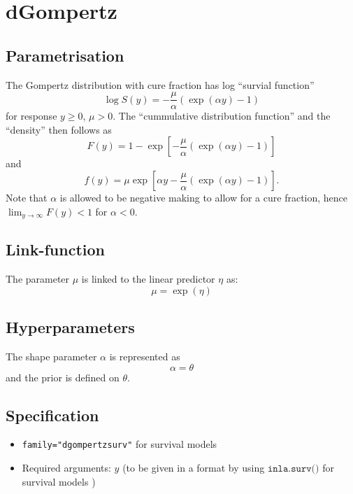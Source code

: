 \documentclass[a4paper,11pt]{article}
\begin{document}
\section*{dGompertz}

\subsection*{Parametrisation}

The Gompertz distribution with cure fraction has log ``survial function''
\begin{displaymath}
    \log S(y) = -\frac{\mu}{\alpha}\left(\exp(\alpha y) -1\right)
\end{displaymath}
for response $y\ge 0$, $\mu>0$. The ``cummulative distribution
function'' and the ``density'' then follows as
\begin{displaymath}
    F(y) = 1 - \exp\left[ -\frac{\mu}{\alpha}\left(\exp(\alpha y)
        -1\right) \right]
\end{displaymath}
and
\begin{displaymath}
    f(y) = \mu \exp\left[ \alpha y -\frac{\mu}{\alpha}\left(\exp(\alpha y)
        -1\right) \right].
\end{displaymath}
Note that $\alpha$ is allowed to be negative making to allow for a
cure fraction, hence $\lim_{y\rightarrow\infty} F(y) < 1$ for
$\alpha<0$.

\subsection*{Link-function}
The parameter $\mu$ is linked to the linear predictor $\eta$ as:
\[
    \mu = \exp(\eta)
\]

\subsection*{Hyperparameters}

The shape parameter $\alpha$ is represented as
\begin{displaymath}
    \alpha = \theta
\end{displaymath}
and the prior is defined on $\theta$. 

\subsection*{Specification}

\begin{itemize}
\item \texttt{family="dgompertzsurv"} for survival models
\item Required arguments: $y$ (to be given in a format by using
    $\texttt{inla.surv()}$ for survival models )
\end{itemize}
\end{document}
